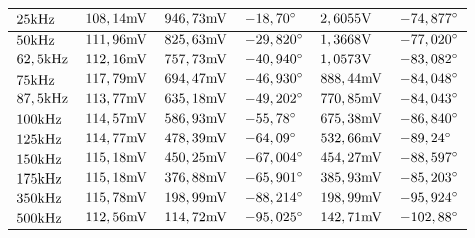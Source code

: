 \begin{table}[H]
\begin{tabular}{ll||l|l||l|l|}
\multicolumn{1}{|l|}{$25\text{kHz}     $}                & $ 108,14\text{mV} $  & $ 946,73\text{mV}  $ & $ -18,70^\circ  $ & $ 2,6055\text{V}      $ & $ -74,877^\circ  $ \\ \hline
\multicolumn{1}{|l|}{$50\text{kHz}     $}                & $ 111,96\text{mV} $  & $ 825,63\text{mV}  $ & $ -29,820^\circ $ & $ 1,3668\text{V}      $ & $ -77,020^\circ  $ \\ \hline
\multicolumn{1}{|l|}{$62,5\text{kHz}   $}                & $ 112,16\text{mV} $  & $ 757,73\text{mV}  $ & $ -40,940^\circ $ & $ 1,0573\text{V}      $ & $ -83,082^\circ  $ \\ \hline
\multicolumn{1}{|l|}{$75\text{kHz}     $}                & $ 117,79\text{mV} $  & $ 694,47\text{mV}  $ & $ -46,930^\circ $ & $ 888,44\text{mV}   $   & $ -84,048^\circ  $ \\ \hline
\multicolumn{1}{|l|}{$87,5\text{kHz}   $}                & $ 113,77\text{mV} $  & $ 635,18\text{mV}  $ & $ -49,202^\circ $ & $ 770,85\text{mV}   $   & $ -84,043^\circ  $ \\ \hline
\multicolumn{1}{|l|}{$100\text{kHz}    $}                & $ 114,57\text{mV} $  & $ 586,93\text{mV}  $ & $ -55,78^\circ  $ & $ 675,38\text{mV}   $   & $ -86,840^\circ  $ \\ \hline
\multicolumn{1}{|l|}{$125\text{kHz}    $}                & $ 114,77\text{mV} $  & $ 478,39\text{mV}  $ & $ -64,09^\circ  $ & $ 532,66\text{mV}   $   & $ -89,24^\circ   $ \\ \hline
\multicolumn{1}{|l|}{$150\text{kHz}    $}                & $ 115,18\text{mV} $  & $ 450,25\text{mV}  $ & $ -67,004^\circ $ & $ 454,27\text{mV}   $   & $ -88,597^\circ  $ \\ \hline
\multicolumn{1}{|l|}{$175\text{kHz}    $}                & $ 115,18\text{mV} $  & $ 376,88\text{mV}  $ & $ -65,901^\circ $ & $ 385,93\text{mV}   $   & $ -85,203^\circ  $ \\ \hline
\multicolumn{1}{|l|}{$350\text{kHz}    $}                & $ 115,78\text{mV} $  & $ 198,99\text{mV}  $ & $ -88,214^\circ $ & $ 198,99\text{mV}   $   & $ -95,924^\circ  $ \\ \hline
\multicolumn{1}{|l|}{$500\text{kHz}    $}                & $ 112,56\text{mV} $  & $ 114,72\text{mV}  $ & $ -95,025^\circ $ & $ 142,71\text{mV}   $   & $ -102,88^\circ  $ \\ \hline
\end{tabular}
\end{table}